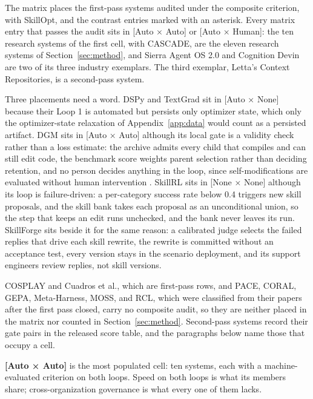 \documentclass[
  11pt,
]{article}
\begin{document}
The matrix places the first-pass systems audited under the composite criterion, with SkillOpt, and the contrast entries marked with an asterisk. Every matrix entry that passes the audit sits in {[}Auto × Auto{]} or {[}Auto × Human{]}: the ten research systems of the first cell, with CASCADE, are the eleven research systems of Section~\ref{sec:method}, and Sierra Agent OS 2.0 and Cognition Devin are two of its three industry exemplars. The third exemplar, Letta's Context Repositories, is a second-pass system.

Three placements need a word. DSPy and TextGrad sit in {[}Auto × None{]} because their Loop 1 is automated but persists only optimizer state, which only the optimizer-state relaxation of Appendix~\ref{app:data} would count as a persisted artifact. DGM sits in {[}Auto × Auto{]} although its local gate is a validity check rather than a loss estimate: the archive admits every child that compiles and can still edit code, the benchmark score weights parent selection rather than deciding retention, and no person decides anything in the loop, since self-modifications are evaluated without human intervention \cite{zhang2025darwin}. SkillRL sits in {[}None × None{]} although its loop is failure-driven: a per-category success rate below 0.4 triggers new skill proposals, and the skill bank takes each proposal as an unconditional union, so the step that keeps an edit runs unchecked, and the bank never leaves its run. SkillForge sits beside it for the same reason: a calibrated judge selects the failed replies that drive each skill rewrite, the rewrite is committed without an acceptance test, every version stays in the scenario deployment, and its support engineers review replies, not skill versions.

COSPLAY and Cuadros et al., which are first-pass rows, and PACE, CORAL, GEPA, Meta-Harness, MOSS, and RCL, which were classified from their papers after the first pass closed, carry no composite audit, so they are neither placed in the matrix nor counted in Section~\ref{sec:method}. Second-pass systems record their gate pairs in the released score table, and the paragraphs below name those that occupy a cell.

\textbf{{[}Auto × Auto{]}} is the most populated cell: ten systems, each with a machine-evaluated criterion on both loops. Speed on both loops is what its members share; cross-organization governance is what every one of them lacks.
\end{document}
